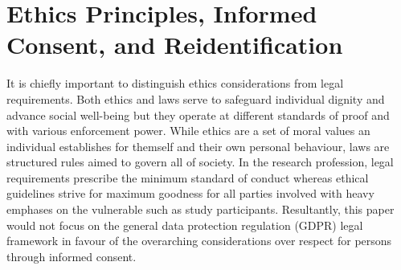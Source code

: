 \documentclass[
        a4paper, %
        12pt, %
        stu, %
        noextraspace, %
        floatsintext, %
        biblatex, %
        twoside, %
        colorlinks=true,        %
        linkcolor=red,          %
        anchorcolor=red,      %
        citecolor=blue,         %
        urlcolor=blue,          %
        bookmarks=true,         %
        bookmarksopen=false,    %
        bookmarksnumbered=true,  %
        dvipsnames
]{apa7}
\begin{document}
\section{Ethics Principles, Informed Consent, and Reidentification}

It is chiefly important to distinguish ethics considerations from legal requirements. Both ethics and laws serve to safeguard individual dignity and advance social well-being but they operate at different standards of proof and with various enforcement power. While ethics are a set of moral values an individual establishes for themself and their own personal behaviour, laws are structured rules aimed to govern all of society. In the research profession, legal requirements prescribe the minimum standard of conduct whereas ethical guidelines strive for maximum goodness for all parties involved with heavy emphases on the vulnerable such as study participants. Resultantly, this paper would not focus on the general data protection regulation (GDPR) legal framework in favour of the overarching considerations over respect for persons through informed consent.
\end{document}
